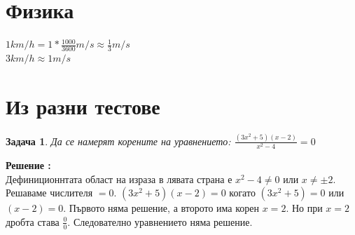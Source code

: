 \documentclass{article}
\newtheorem{problem}{Задача}
\newcounter{solution}
\newcommand\solution{%
	\stepcounter{solution}%
	\textbf{Решение :}\\%
}
\begin{document}
\section{Физика}
$1 km/h = 1*\frac{1000}{3600} m/s \approx \frac{1}{3} m/s $ \\
$3 km/h \approx	1 m/s $ 

\section{Из разни тестове}

\begin{problem}
	Да се намерят корените на уравнението:
	$\frac{(3x^2 + 5)(x-2)}{x^2-4} = 0$
\end{problem}
\solution Дефиниционнтата област на израза в лявата страна е $x^2 -4 \neq 0$ или $ x \neq \pm 2 $. Решаваме числителя $ = 0$. $ (3x^2 + 5)(x-2)=0$ когато $(3x^2 + 5)=0 $ или $(x-2)=0 $. Първото няма решение, а второто има корен $x=2$. Но при $x=2$ дробта става $\frac{0}{0}$. Следователно уравнението няма решение.
\end{document}
